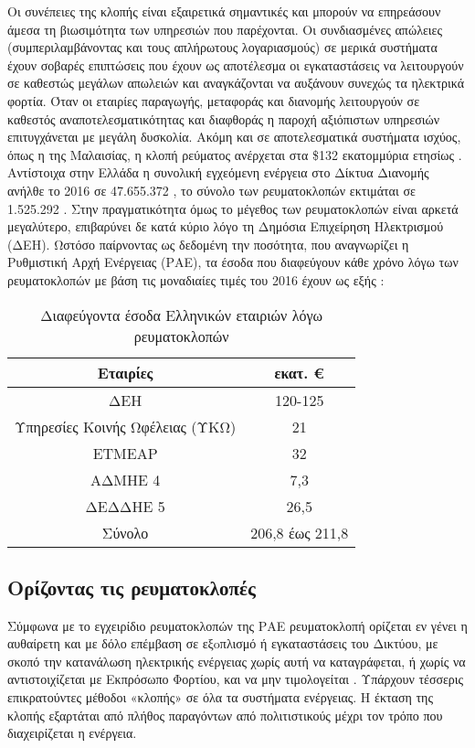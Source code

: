 Οι συνέπειες της κλοπής είναι εξαιρετικά σημαντικές και μπορούν να επηρεάσουν άμεσα τη βιωσιμότητα των υπηρεσιών που παρέχονται. Οι συνδιασμένες απώλειες (συμπεριλαμβάνοντας και τους απλήρωτους λογαριασμούς) σε μερικά συστήματα έχουν σοβαρές επιπτώσεις που έχουν ως αποτέλεσμα οι εγκαταστάσεις να λειτουργούν σε καθεστώς μεγάλων απωλειών και αναγκάζονται να αυξάνουν συνεχώς τα ηλεκτρικά φορτία. Όταν οι εταιρίες παραγωγής, μεταφοράς και διανομής λειτουργούν σε καθεστός αναποτελεσματικότητας και διαφθοράς η παροχή αξιόπιστων υπηρεσιών επιτυγχάνεται με μεγάλη δυσκολία. Ακόμη και σε αποτελεσματικά συστήματα ισχύος, όπως η  της Μαλαισίας, η κλοπή ρεύματος ανέρχεται στα \$132 εκατομμύρια ετησίως \cite{malaysia}. Αντίστοιχα στην Ελλάδα η συνολική εγχεόμενη ενέργεια στο Δίκτυα Διανομής ανήλθε το 2016 σε 47.655.372 , το σύνολο των ρευματοκλοπών εκτιμάται σε 1.525.292 . Στην πραγματικότητα όμως το μέγεθος των ρευματοκλοπών είναι αρκετά μεγαλύτερο, επιβαρύνει δε κατά κύριο λόγο τη Δημόσια Επιχείρηση Ηλεκτρισμού (ΔΕΗ). Ωστόσο παίρνοντας ως δεδομένη την ποσότητα, που αναγνωρίζει η Ρυθμιστική Αρχή Ενέργειας (ΡΑΕ), τα έσοδα που διαφεύγουν κάθε χρόνο λόγω των ρευματοκλοπών με βάση τις μοναδιαίες τιμές του 2016 έχουν ως εξής \cite{dehfraud}:

\begin{table}[ht!]
\centering
\begin{tabular}{ |c||c|  }
 \hline
 Εταιρίες & εκατ. \euro\\
 \hline
 ΔΕΗ & 120-125\\
 Υπηρεσίες Κοινής Ωφέλειας (ΥΚΩ) & 21\\
 ΕΤΜΕΑΡ & 32\\
 ΑΔΜΗΕ 4 & 7,3\\
 ΔΕΔΔΗΕ 5 & 26,5\\
 \hline
 Σύνολο& 206,8 έως 211,8\\
 \hline
\end{tabular}
\caption{Διαφεύγοντα έσοδα Ελληνικών εταιριών λόγω ρευματοκλοπών}
\label{tab:lostearnings}
\end{table}
\subsection{Ορίζοντας τις ρευματοκλοπές}
Σύμφωνα με το εγχειρίδιο ρευματοκλοπών της ΡΑΕ ρευματοκλοπή ορίζεται εν γένει η αυθαίρετη και με δόλο επέμβαση σε εξoπλισμό ή εγκαταστάσεις του Δικτύου, με σκοπό την κατανάλωση ηλεκτρικής ενέργειας χωρίς αυτή να καταγράφεται, ή χωρίς να αντιστοιχίζεται με Εκπρόσωπο Φορτίου, και να μην τιμολογείται \cite{rae}. Υπάρχουν τέσσερις επικρατούντες μέθοδοι «κλοπής» σε όλα τα συστήματα ενέργειας. Η έκταση της κλοπής εξαρτάται από πλήθος παραγόντων από πολιτιστικούς μέχρι τον τρόπο που διαχειρίζεται η ενέργεια. 

